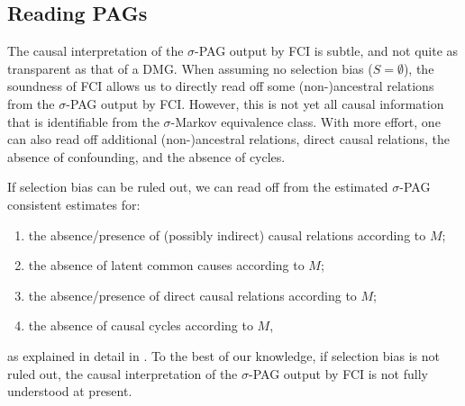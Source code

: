 \subsection{Reading PAGs}


The causal interpretation of the $\sigma$-PAG output by FCI is subtle, and not quite as transparent as that of a DMG.
When assuming no selection bias ($S = \emptyset$), the soundness of FCI allows us to directly read off some (non-)ancestral relations from the $\sigma$-PAG output by FCI. 
However, this is not yet all causal information that is identifiable from the $\sigma$-Markov equivalence class. 
With more effort, one can also read off additional (non-)ancestral relations, direct causal relations, the absence of confounding, and the absence of cycles. 

If selection bias can be ruled out, we can read off from the estimated $\sigma$-PAG consistent estimates for:
  \begin{enumerate}[label=(\roman*)]
  \item the absence/presence of (possibly indirect) causal relations according to $M$; 
  \item the absence of latent common causes according to $M$;
  \item the absence/presence of direct causal relations according to $M$;
  \item the absence of causal cycles according to $M$,
  \end{enumerate}
as explained in detail in \cite{MooijClaassen_UAI_20}.
To the best of our knowledge, if selection bias is not ruled out, the causal interpretation of the $\sigma$-PAG output by FCI is not fully understood at present.

